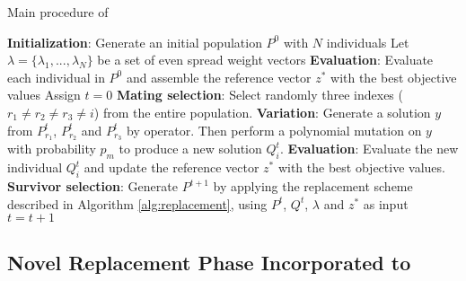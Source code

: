 \begin{algorithm}[!t]
        \caption{Main procedure of \VSDMOEAD{}}
        \begin{small}
\begin{algorithmic}[1]
        \STATE \textbf{Initialization}: Generate an initial population $P^0$ with $N$ individuals \label{alg_1:1}
        \STATE Let $\lambda = \{\lambda_1, ..., \lambda_N \}$ be a set of even spread weight vectors \label{alg_1:2}
        \STATE \textbf{Evaluation}: Evaluate each individual in $P^0$ and assemble the reference vector $z^*$ with the best objective values \label{alg_1:3}
        \STATE Assign $t=0$ \label{alg_1:4}
         \label{alg_1:5}
            \label{alg_1:6}
               \STATE \textbf{Mating selection}: Select randomly three indexes ($r_1 \neq r_2 \neq r_3 \neq i$) from the entire population. \label{alg_1:7}
               \STATE \textbf{Variation}: Generate a solution $y$ from $P^t_{r_1}$, $P^t_{r_2}$ and $P^t_{r_3}$ by \DE{} operator. Then perform a polynomial mutation on $y$ with probability $p_m$ to produce a new solution $Q^t_{i}$. \label{alg_1:8}
               \STATE \textbf{Evaluation}: Evaluate the new individual $Q^t_{i}$ and update the reference vector $z^*$ with the best objective values. \label{alg_1:9}
           \ENDFOR \label{alg_1:10}
           \STATE \textbf{Survivor selection}: Generate $P^{t+1}$ by applying the replacement scheme described in  Algorithm \ref{alg:replacement}, using $P^t$, $Q^t$, $\lambda$ and $z^*$ as input \label{alg_1:11}
           \STATE $t=t+1$ \label{alg_1:12}
        \ENDWHILE \label{alg_1:13}
        \end{algorithmic}
        \end{small}
\label{alg:vsd-moead}
\end{algorithm}


%
\subsection{Novel Replacement Phase Incorporated to \VSDMOEAD{} }


